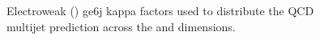 \begin{figure}[!h]
{    } \\
     ~~
     ~~
    \caption{
        Electroweak (\ttw) ge6j kappa factors used to distribute
        the QCD multijet prediction across the \nb and \mht dimensions.
    }
    \label{fig:ewk_kappas_ge6j}
\end{figure}

